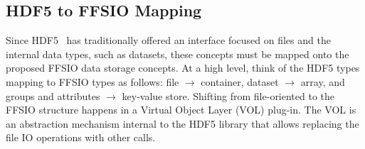 \documentclass{sig-alt-gov2}
\begin{document}
%
%
%

\subsection{HDF5 to FFSIO Mapping}
\label{sec:hdf-to-ffsio}

Since HDF5~\cite{hdf5} has traditionally offered an interface focused on files and the
internal data types, such as datasets, these concepts must be mapped onto the
proposed FFSIO data storage concepts. At a high level, think of the HDF5 types
mapping to FFSIO types as follows: file $\rightarrow$ container, dataset $\rightarrow$
array, and groups and attributes $\rightarrow$ key-value store.
Shifting from file-oriented to the FFSIO structure happens in a Virtual Object Layer (VOL) plug-in. The VOL is an abstraction mechanism internal to the HDF5
library that allows replacing the file IO operations with other calls.
\end{document}
